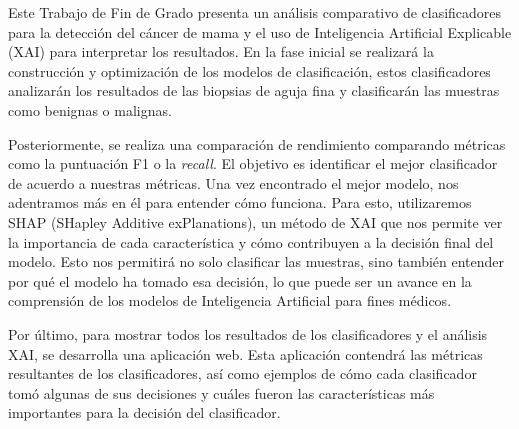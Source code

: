 Este Trabajo de Fin de Grado
presenta un análisis comparativo de clasificadores para la detección del cáncer de mama y el uso de Inteligencia Artificial Explicable (XAI) para interpretar los resultados. En la fase inicial se realizará la construcción y optimización de los modelos de clasificación, estos clasificadores analizarán los resultados de las biopsias de aguja fina y clasificarán las muestras como benignas o malignas.

Posteriormente, se realiza una comparación de rendimiento comparando métricas como la puntuación F1 o la \textit{recall}. El objetivo es identificar el mejor clasificador de acuerdo a nuestras métricas. Una vez encontrado el mejor modelo, nos adentramos más en él para entender cómo funciona. Para esto, utilizaremos SHAP (SHapley Additive exPlanations), un método de XAI que nos permite ver la importancia de cada característica y cómo contribuyen a la decisión final del modelo. Esto nos permitirá no solo clasificar las muestras, sino también entender por qué el modelo ha tomado esa decisión, lo que puede ser un avance en la comprensión de los modelos de 
Inteligencia Artificial
para fines médicos.

Por último, para mostrar todos los resultados de los clasificadores y el análisis XAI, se desarrolla una aplicación web. Esta aplicación contendrá las métricas resultantes de los clasificadores, así como ejemplos de cómo cada clasificador tomó algunas de sus decisiones y cuáles fueron las características más importantes para la decisión del clasificador.

